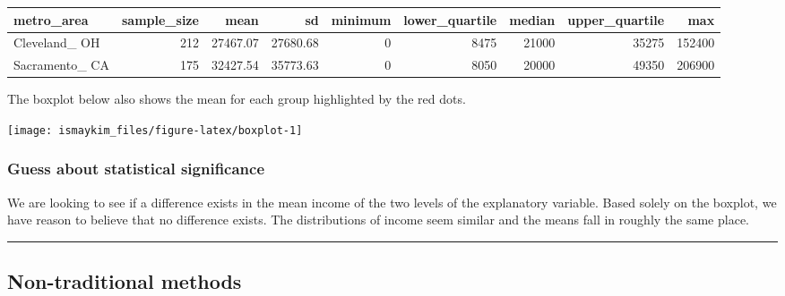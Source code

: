 \documentclass[]{tufte-book}
\newenvironment{Shaded}{\begin{snugshade}}{\end{snugshade}}
\newcommand{\KeywordTok}[1]{\textcolor[rgb]{0.13,0.29,0.53}{\textbf{{#1}}}}
\newcommand{\DataTypeTok}[1]{\textcolor[rgb]{0.13,0.29,0.53}{{#1}}}
\newcommand{\StringTok}[1]{\textcolor[rgb]{0.31,0.60,0.02}{{#1}}}
\newcommand{\NormalTok}[1]{{#1}}
\let\oldrule=\rule
\renewcommand{\rule}[1]{\oldrule{\linewidth}}
\begin{document}
\begin{tabular}{l|r|r|r|r|r|r|r|r}
\hline
metro\_area & sample\_size & mean & sd & minimum & lower\_quartile & median & upper\_quartile & max\\
\hline
Cleveland\_ OH & 212 & 27467.07 & 27680.68 & 0 & 8475 & 21000 & 35275 & 152400\\
\hline
Sacramento\_ CA & 175 & 32427.54 & 35773.63 & 0 & 8050 & 20000 & 49350 & 206900\\
\hline
\end{tabular}

The boxplot below also shows the mean for each group highlighted by the
red dots.

\begin{Shaded}
\end{Shaded}

\begin{center}\texttt{[image: ismaykim\_files/figure-latex/boxplot-1]} \end{center}

\subsubsection{Guess about statistical
significance}\label{guess-about-statistical-significance-3}

We are looking to see if a difference exists in the mean income of the
two levels of the explanatory variable. Based solely on the boxplot, we
have reason to believe that no difference exists. The distributions of
income seem similar and the means fall in roughly the same place.

\begin{center}\rule{0.5\linewidth}{\linethickness}\end{center}

\subsection{Non-traditional methods}\label{non-traditional-methods-3}
\end{document}
